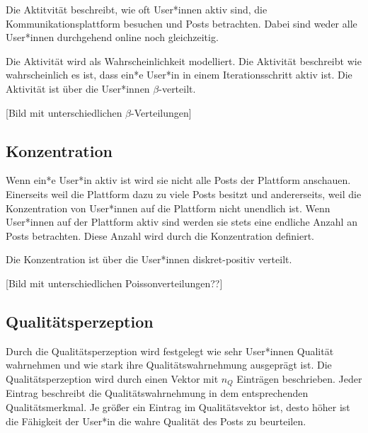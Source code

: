 Die Aktitvität beschreibt, wie oft User*innen aktiv sind, die Kommunikationsplattform besuchen und Posts betrachten. Dabei sind weder alle User*innen durchgehend online noch gleichzeitig. 

Die Aktivität wird als Wahrscheinlichkeit modelliert. Die Aktivität beschreibt wie wahrscheinlich es ist, dass ein*e User*in in einem Iterationsschritt aktiv ist. Die Aktivität ist über die User*innen $\beta$-verteilt.


[Bild mit unterschiedlichen $\beta$-Verteilungen]

\subsection{Konzentration}

Wenn ein*e User*in aktiv ist wird sie nicht alle Posts der Plattform anschauen. Einerseits weil die Plattform dazu zu viele Posts besitzt und andererseits, weil die Konzentration von User*innen auf die Plattform nicht unendlich ist. Wenn User*innen auf der Plattform aktiv sind werden sie  stets eine endliche Anzahl an Posts betrachten. Diese Anzahl wird durch die Konzentration definiert.

Die Konzentration ist über die User*innen diskret-positiv verteilt.

[Bild mit unterschiedlichen Poissonverteilungen??]

\subsection{Qualitätsperzeption}
\label{uqualitaet}

Durch die Qualitätsperzeption wird festgelegt wie sehr User*innen Qualität wahrnehmen und wie stark ihre Qualitätswahrnehmung ausgeprägt ist. Die Qualitätsperzeption wird durch einen Vektor mit $n_Q$  Einträgen beschrieben. Jeder Eintrag beschreibt die Qualitätswahrnehmung in dem entsprechenden Qualitätsmerkmal. Je größer ein Eintrag im Qualitätsvektor ist, desto höher ist die Fähigkeit der User*in die wahre Qualität des Posts zu beurteilen.


